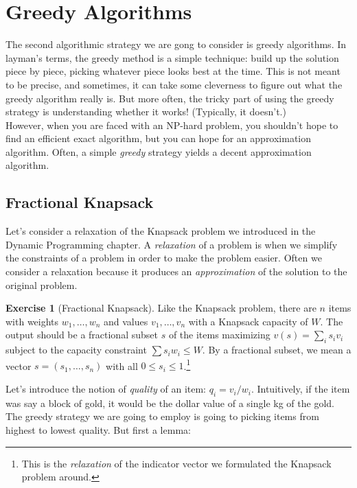 \documentclass[10pt]{article}
\theoremstyle{plain}
\theoremstyle{definition}
\newtheorem{exer}[thm]{Exercise}
\numberwithin{equation}{section}
\numberwithin{figure}{section}
\begin{document}
\newpage
\section{Greedy Algorithms}
The second algorithmic strategy we are gong to consider is greedy algorithms. In layman's terms, the greedy method is a simple technique: build up the solution piece by piece, picking whatever piece looks best at the time. This is not meant to be precise, and sometimes, it can take some cleverness to figure out what the greedy algorithm really is. But more often, the tricky part of using the greedy strategy is understanding whether it works! (Typically, it doesn't.) \\

\noindent However, when you are faced with an NP-hard problem, you shouldn't hope to find an efficient exact algorithm, but you can hope for an approximation algorithm. Often, a simple \emph{greedy} strategy yields a decent approximation algorithm.

\subsection{Fractional Knapsack}

Let's consider a relaxation of the Knapsack problem we introduced in the Dynamic Programming chapter. A \emph{relaxation} of a problem is when we simplify the constraints of a problem in order to make the problem easier. Often we consider a relaxation because it produces an \emph{approximation} of the solution to the original problem.

\begin{exer}[Fractional Knapsack]
Like the Knapsack problem, there are $n$ items with weights $w_1, \ldots, w_n$ and values $v_1, \ldots, v_n$ with a Knapsack capacity of $W$. The output should be a fractional subset $s$ of the items maximizing $v(s) = \sum_i s_i v_i$ subject to the capacity constraint $\sum s_i w_i \leq W$. By a fractional subset, we mean a vector $s = (s_1, \ldots, s_n)$ with all $0 \leq s_i \leq 1$.\footnote{This is the \emph{relaxation} of the indicator vector we formulated the Knapsack problem around.}
\end{exer}

\noindent Let's introduce the notion of \emph{quality} of an item: $q_i = v_i / w_i$. Intuitively, if the item was say a block of gold, it would be the dollar value of a single kg of the gold. The greedy strategy we are going to employ is going to picking items from highest to lowest quality. But first a lemma:
\end{document}
